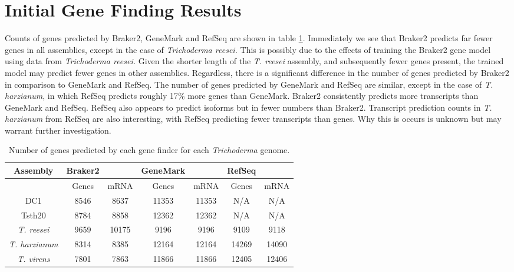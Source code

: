 \section{Initial Gene Finding Results} 

Counts of genes predicted by Braker2, GeneMark and RefSeq are shown in
table \ref{table:gene-counts}. Immediately we see that Braker2
predicts far fewer genes in all assemblies, except in the case of
\textit{Trichoderma reesei.} This is possibly due to the effects of
training the Braker2 gene model using data from \textit{Trichoderma
  reesei.} Given the shorter length of the \textit{T. reesei}
assembly, and subsequently fewer genes present, the trained model may
predict fewer genes in other assemblies. Regardless, there is a
significant difference in the number of genes predicted by Braker2 in
comparison to GeneMark and RefSeq. The number of genes predicted by
GeneMark and RefSeq are similar, except in the case of
\textit{T. harzianum}, in which RefSeq predicts roughly 17\% more
genes than GeneMark. Braker2 consistently predicts more transcripts
than GeneMark and RefSeq. RefSeq also appears to predict isoforms but
in fewer numbers than Braker2. Transcript prediction counts in
\textit{T. harzianum} from RefSeq are also interesting, with RefSeq
predicting fewer transcripts than genes. Why this is occurs is unknown
but may warrant further investigation.

\begin{table}
  \centering
  \begin{tabular}{|c|c|c|c|c|c|c|}
    \hline
    Assembly & Braker2 & & GeneMark & & RefSeq & \\ \hline
     & Genes & mRNA & Genes & mRNA & Genes & mRNA \\ \hline
    DC1 & 8546 & 8637 & 11353 & 11353 & N/A & N/A \\ \hline
    Tsth20 & 8784 & 8858 & 12362 & 12362 & N/A & N/A \\ \hline
    \textit{T. reesei} & 9659 & 10175 & 9196 & 9196 & 9109 & 9118 \\ \hline
    \textit{T. harzianum} & 8314 & 8385 & 12164 & 12164 & 14269 & 14090 \\ \hline
    \textit{T. virens} & 7801 & 7863 & 11866 & 11866 & 12405 & 12406 \\ \hline
  \end{tabular}
  \caption[Gene prediction counts]{Number of genes predicted by each
    gene finder for each \textit{Trichoderma} genome.}
  \label{table:gene-counts}
\end{table}



